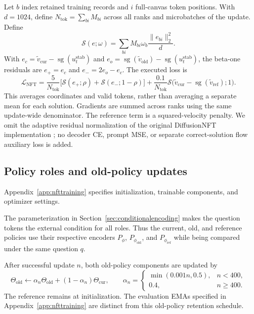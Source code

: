\documentclass[11pt,letterpaper]{article}
\newcommand{\sg}{\operatorname{sg}}
\begin{document}
Let $b$ index retained training records and $i$ full-canvas token positions. With $d=1024$, define $N_{\mathrm{tok}}=\sum_{bi}M_{bi}$ across all ranks and microbatches of the update. Define
\begin{equation}
 \mathcal S(e;\omega)=\sum_{bi}M_{bi}\omega_b\frac{\|e_{bi}\|_2^2}{d}.
 \label{eq:nfttokensum}
\end{equation}
With $e_c=\widetilde v_{\mathrm{cur}}-\sg(u_t^{\mathrm{stab}})$ and $e_o=\sg(\widetilde v_{\mathrm{old}})-\sg(u_t^{\mathrm{stab}})$, the beta-one residuals are $e_+=e_c$ and $e_-=2e_o-e_c$. The executed loss is
\begin{equation}
 \mathcal L_{\mathrm{NFT}}=
 \frac{5}{N_{\mathrm{tok}}}\bigl[\mathcal S(e_+;\rho)+\mathcal S(e_-;1-\rho)\bigr]
 +\frac{0.1}{N_{\mathrm{tok}}}\mathcal S\bigl(\widetilde v_{\mathrm{cur}}-\sg(\widetilde v_{\mathrm{ref}});1\bigr).
 \label{eq:nftexecutedloss}
\end{equation}
This averages coordinates and valid tokens, rather than averaging a separate mean for each solution. Gradients are summed across ranks using the same update-wide denominator. The reference term is a squared-velocity penalty. We omit the adaptive residual normalization of the original DiffusionNFT implementation \citep{diffusionnft}; no decoder CE, prompt MSE, or separate correct-solution flow auxiliary loss is added.

\subsection{Policy roles and old-policy updates}
\label{sec:nftjoint}

Appendix~\ref{app:nfttraining} specifies initialization, trainable components, and optimizer settings.

The parameterization in Section~\ref{sec:conditionalencoding} makes the question tokens the external condition for all roles. Thus the current, old, and reference policies use their respective encoders $P_\phi$, $P_{\phi_{\mathrm{old}}}$, and $P_{\phi_{\mathrm{ref}}}$ while being compared under the same question $q$.

After successful update $n$, both old-policy components are updated by
\begin{equation}
 \Theta_{\mathrm{old}}\leftarrow \alpha_n\Theta_{\mathrm{old}}+(1-\alpha_n)\Theta_{\mathrm{cur}},
 \qquad \alpha_n=\begin{cases}\min(0.001n,0.5),&n<400,\\0.4,&n\ge400.\end{cases}
 \label{eq:nftoldema}
\end{equation}
The reference remains at initialization. The evaluation EMAs specified in Appendix~\ref{app:nfttraining} are distinct from this old-policy retention schedule.
\end{document}
